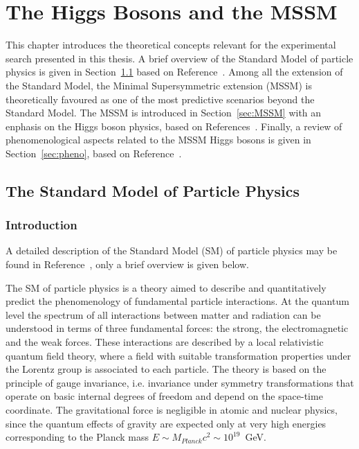 
\chapter{The Higgs Bosons and the MSSM} \label{chap:theory}

 \vspace{2cm}

This chapter  introduces the theoretical concepts relevant for the experimental search presented in this thesis.
A brief overview of the Standard Model of particle physics is given in Section~\ref{sec:SM} based on Reference~\cite{Altarelli}. 
Among all the extension of the Standard Model, the Minimal Supersymmetric 
extension (MSSM) is  theoretically favoured  as one of the most predictive
scenarios beyond the Standard Model. The MSSM is introduced in Section~\ref{sec:MSSM} with an enphasis on the Higgs boson physics, based on 
References~\cite{SusyPrimer,Djuadi}.
Finally, a review of phenomenological aspects related to the MSSM Higgs bosons is given 
in Section~\ref{sec:pheno}, based on Reference~\cite{LHCxsec}.

\restoregeometry

\clearpage

\section{The Standard Model of Particle Physics} \label{sec:SM}
\subsection{Introduction}
A detailed description of the Standard Model (SM) of particle physics may be found in Reference~\cite{Peskin}, only a brief overview is
given below.

The SM of particle physics is a theory aimed to describe and quantitatively predict
the phenomenology of fundamental particle interactions. At the quantum  level the spectrum of all interactions between matter and 
radiation can be understood in terms of three fundamental forces: the strong, the electromagnetic
and the weak forces. These interactions are described by a local relativistic quantum field theory, where 
a field with suitable transformation properties under the Lorentz group is associated to each particle.
The theory is based on the principle of gauge invariance, i.e. invariance under  symmetry  transformations    
that operate on basic internal degrees of freedom and depend on the space-time coordinate.
The gravitational force is negligible in atomic and nuclear physics, since the
quantum effects of gravity are expected only at very high energies corresponding to the Planck mass $E \sim M_{Planck} c^2 \sim 10^{19}$~GeV.


